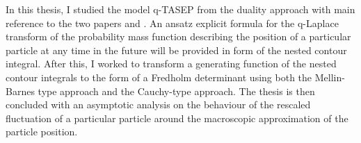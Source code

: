% 
% 
%
In this thesis, I studied the model q-TASEP from the duality approach with main reference to the two papers \cite{duality2014} and \cite{asymptotics2013}. An ansatz explicit formula for the q-Laplace transform of the probability mass function describing the position of a particular particle at any time in the future will be provided in form of the nested contour integral. After this, I worked to transform a generating function of the nested contour integrals to the form of a Fredholm determinant using both the Mellin-Barnes type approach and the Cauchy-type approach. The thesis is then concluded with an asymptotic analysis on the behaviour of the rescaled fluctuation of a particular particle around the macroscopic approximation of the particle position.